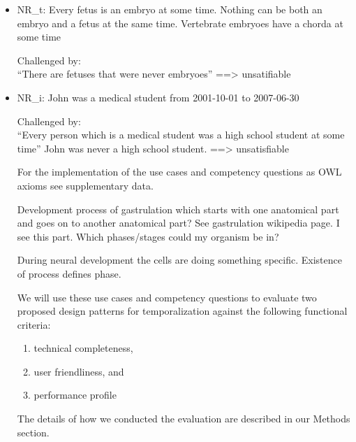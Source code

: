 \begin{itemize}


\item NR\_t: Every fetus is an embryo at some time. Nothing can be both an embryo and a fetus at the same time. Vertebrate embryoes have a chorda at some time

Challenged by: \\ ``There are fetuses that were never embryoes''  ==> unsatifiable




\item NR\_i: John was a medical student from 2001-10-01 to 2007-06-30

Challenged by: \\ ``Every person which is a medical student was a high school student at some time''   
John was never a high school student. ==> unsatisfiable




For the implementation of the use cases and competency questions as OWL axioms see supplementary data.
 

Development process of gastrulation which starts with one anatomical part and goes on to another anatomical part? See gastrulation wikipedia page. 
I see this part. Which phases/stages could my organism be in?

During neural development the cells are doing something specific. Existence of process defines phase.


We will use these use cases and competency questions to evaluate two proposed design patterns for temporalization against the following functional criteria:
\begin{enumerate}
    \item technical completeness, 
    \item user friendliness, and
    \item performance profile
\end{enumerate}
The details of how we conducted the evaluation are described in our Methods section.

\end{itemize}




 
